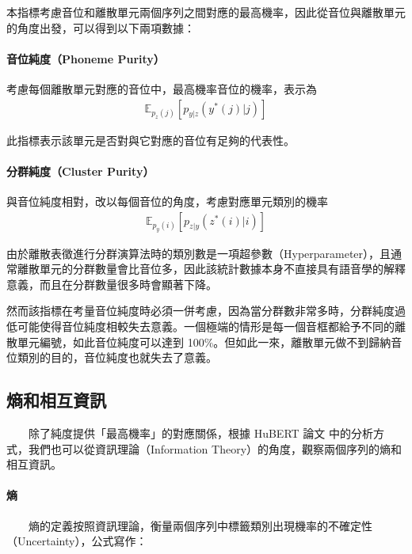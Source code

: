         本指標考慮音位和離散單元兩個序列之間對應的最高機率，因此從音位與離散單元的角度出發，可以得到以下兩項數據：

\paragraph{音位純度（Phoneme Purity）}

        考慮每個離散單元對應的音位中，最高機率音位的機率，表示為
    \begin{align}
      \mathbb{E}_{p_z(j)}\left[p_{y|z}(y^*(j)|j) \right]
    \end{align}

此指標表示該單元是否對與它對應的音位有足夠的代表性。

\paragraph{分群純度（Cluster Purity）}

        與音位純度相對，改以每個音位的角度，考慮對應單元類別的機率
    \begin{align}
      \mathbb{E}_{p_y(i)}\left[p_{z|y}(z^*(i)|i) \right]
    \end{align}

        由於離散表徵進行分群演算法時的類別數是一項超參數（Hyperparameter），且通常離散單元的分群數量會比音位多，因此該統計數據本身不直接具有語音學的解釋意義，而且在分群數量很多時會顯著下降。

        然而該指標在考量音位純度時必須一併考慮，因為當分群數非常多時，分群純度過低可能使得音位純度相較失去意義。一個極端的情形是每一個音框都給予不同的離散單元編號，如此音位純度可以達到 100\%。但如此一來，離散單元做不到歸納音位類別的目的，音位純度也就失去了意義。

\subsection{熵和相互資訊}

　　除了純度提供「最高機率」的對應關係，根據 HuBERT 論文 \cite{hsu_hubert_2021-2} 中的分析方式，我們也可以從資訊理論（Information Theory）的角度，觀察兩個序列的熵和相互資訊。

\paragraph{熵}

　　熵的定義按照資訊理論，衡量兩個序列中標籤類別出現機率的不確定性（Uncertainty），公式寫作：

